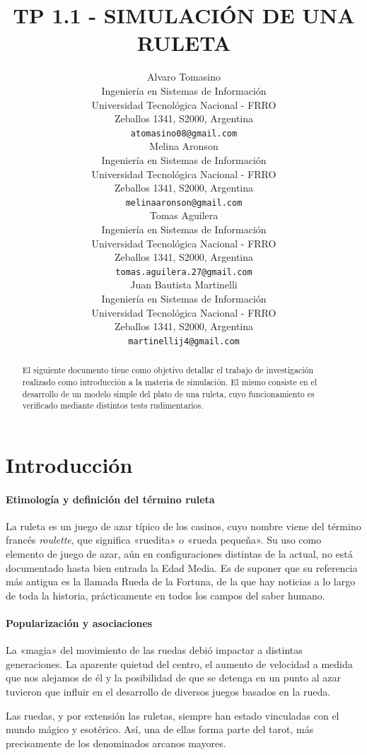 \documentclass{article}
\title{TP 1.1 - SIMULACIÓN DE UNA RULETA}
\author{
    Alvaro Tomasino \\
    Ingeniería en Sistemas de Información\\
    Universidad Tecnológica Nacional - FRRO\\
    Zeballos 1341, S2000, Argentina\\
    \texttt{atomasino08@gmail.com} \\
\And
    Melina Aronson \\
    Ingeniería en Sistemas de Información\\
    Universidad Tecnológica Nacional - FRRO\\
    Zeballos 1341, S2000, Argentina\\
    \texttt{melinaaronson@gmail.com} \\
\And
    Tomas Aguilera \\
    Ingeniería en Sistemas de Información\\
    Universidad Tecnológica Nacional - FRRO\\
    Zeballos 1341, S2000, Argentina\\
    \texttt{tomas.aguilera.27@gmail.com} \\
\And
    Juan Bautista Martinelli \\
    Ingeniería en Sistemas de Información\\
    Universidad Tecnológica Nacional - FRRO\\
    Zeballos 1341, S2000, Argentina\\
    \texttt{martinellij4@gmail.com} \\
}
\begin{document}
\maketitle




\begin{abstract}
  El siguiente documento tiene como objetivo detallar el trabajo de investigación realizado como introducción a la 
  materia de simulación. El mismo consiste en el desarrollo de un modelo simple del plato de una ruleta, cuyo 
  funcionamiento es verificado mediante distintos tests rudimentarios.
\end{abstract}







\section{Introducción}
\paragraph{Etimología y definición del término ruleta} La ruleta \cite{ruleta_wiki} es un juego de azar típico de 
los casinos, cuyo nombre viene del término francés \textit{roulette}, que significa «ruedita» o «rueda pequeña». 
Su uso como elemento de juego de azar, aún en configuraciones distintas de la actual, no está documentado hasta 
bien entrada la Edad Media. Es de suponer que su referencia más antigua es la llamada Rueda de la Fortuna, de la que 
hay noticias a lo largo de toda la historia, prácticamente en todos los campos del saber humano.

\paragraph{Popularización y asociaciones}
La «magia» del movimiento de las ruedas debió impactar a distintas generaciones. La aparente quietud del centro, el 
aumento de velocidad a medida que nos alejamos de él y la posibilidad de que se detenga en un punto al azar tuvieron 
que influir en el desarrollo de diversos juegos basados en la rueda.

Las ruedas, y por extensión las ruletas, siempre han estado vinculadas con el mundo mágico y esotérico. Así, una de 
ellas forma parte del tarot, más precisamente de los denominados arcanos mayores.
\end{document}
